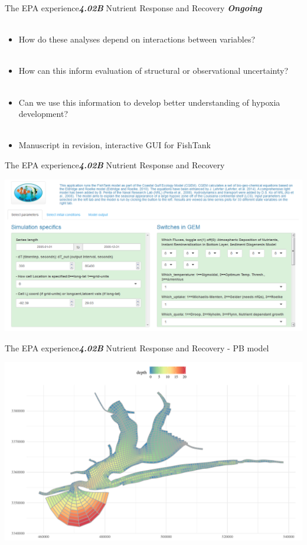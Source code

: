 \documentclass[serif]{beamer}\usepackage[]{graphicx}\usepackage[]{color}
\makeatletter
\def\maxwidth{ %
  \ifdim\Gin@nat@width>\linewidth
    \linewidth
  \else
    \Gin@nat@width
  \fi
}
\newcommand{\emtxt}[1]{\textbf{\textit{#1}}}
\makeatother
\begin{document}
\begin{frame}{The EPA experience}{\emtxt{4.02B} Nutrient Response and Recovery}
\emtxt{Ongoing}\\~\\
\begin{itemize}
\item How do these analyses depend on interactions between variables? \\~\\
\item How can this inform evaluation of structural or observational uncertainty? \\~\\
\item Can we use this information to develop better understanding of hypoxia development? \\~\\
\item Manuscript in revision, interactive GUI for FishTank
\end{itemize}
\end{frame}

\begin{frame}{The EPA experience}{\emtxt{4.02B} Nutrient Response and Recovery}
\centerline{\includegraphics[width = 1.05\textwidth]{fig/fishtank_gui.png}}
\end{frame}

\begin{frame}{The EPA experience}{\emtxt{4.02B} Nutrient Response and Recovery - PB model}


{\centering \includegraphics[width=\maxwidth]{fig/unnamed-chunk-4-1} 

}



\end{frame}
\end{document}
